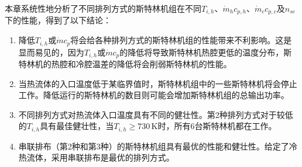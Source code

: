 本章系统性地分析了不同排列方式的斯特林机组在不同$T_{i,h}$、$\dot{m}_hc_{p,h}$、$\dot{m}_cc_{p,c}$及$n_{se}$下的性能，得到了以下结论：

\begin{enumerate}[label=(\arabic*)]
	\item 降低$T_{i,h}$或$\dot{m}c_{p}$将会给各种排列方式的斯特林机组的性能带来不利影响。这是显而易见的，因为$T_{i,h}$或$\dot{m}c_p$的降低将导致斯特林机热腔更低的温度分布，斯特林机的热腔和冷腔温差的降低将会削弱斯特林机的性能。
	\item 当热流体的入口温度低于某临界值时，斯特林机组中的一些斯特林机将会停止工作。降低运行的斯特林机的数目则可能会增加斯特林机组的总输出功率。
	\item 不同排列方式对热流体入口温度具有不同的健壮性。第2种排列方式对于较低的$T_{i,h}$具有最佳健壮性，当$T_{i,h} \geqslant 730\,\mathrm{K}$时，所有6台斯特林机都在工作。
	\item 串联排布（第2种和第3种）的斯特林机组具有最优的性能和健壮性。给定了冷热流体，采用串联排布是最优的排列方式。
\end{enumerate}